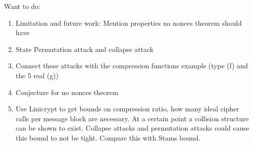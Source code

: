 Want to do:
\begin{enumerate}
\item Limitation and future work: Mention properties no nonces theorem should have
\item State Permutation attack and collapse attack
\item Connect these attacks with the compression functions example (type (f) and the 5 real (g))
\item Conjecture for no nonces theorem
\item Use Linicrypt to get bounds on compression ratio, how many ideal cipher calls per message block are necessary.
At a certain point a collision structure can be shown to exist.
Collapse attacks and permutation attacks could cause this bound to not be tight.
Compare this with Stams bound.
\end{enumerate}
